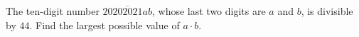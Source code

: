 The ten-digit number $\overline{20202021ab}$, whose last two digits are $a$ and $b$, is divisible by $44$. Find the largest possible value of $a\cdot b$.
